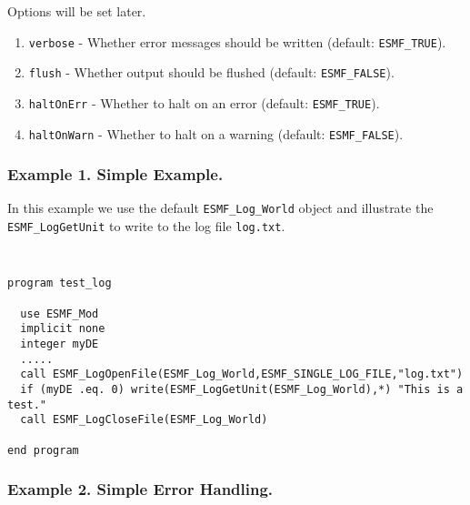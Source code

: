 %


Options will be set later.
\begin{enumerate}
\item {\tt verbose} - Whether error messages should be written (default: {\tt ESMF\_TRUE}).
\item {\tt flush} - Whether output should be flushed (default:  {\tt ESMF\_FALSE}).
\item {\tt haltOnErr} - Whether to halt on an error (default:  {\tt ESMF\_TRUE}).
\item {\tt haltOnWarn} - Whether to halt on a warning (default:  {\tt ESMF\_FALSE}).
\end {enumerate}

\subsubsection{Example 1. Simple Example.}

In this example we use the default {\tt ESMF\_Log\_World} object and 
illustrate the {\tt ESMF\_LogGetUnit} to write to the log file 
{\tt log.txt}.

{\tt
\begin{verbatim}
program test_log

  use ESMF_Mod
  implicit none
  integer myDE
  .....
  call ESMF_LogOpenFile(ESMF_Log_World,ESMF_SINGLE_LOG_FILE,"log.txt")
  if (myDE .eq. 0) write(ESMF_LogGetUnit(ESMF_Log_World),*) "This is a test."
  call ESMF_LogCloseFile(ESMF_Log_World)

end program
\end{verbatim}
\tt}

\subsubsection{Example 2. Simple Error Handling.}


